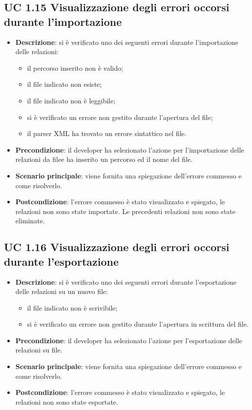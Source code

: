 	\subsection{UC 1.15 Visualizzazione degli errori occorsi durante l'importazione}
		\label{subsec:XEUC1.15}
		
		\begin{itemize}
			\item\textbf{Descrizione}: si è verificato uno dei seguenti errori durante l'importazione delle relazioni:
			\begin{itemize}
				\item il percorso inserito non è valido;
				\item il file indicato non esiste;
				\item il file indicato non è leggibile;
				\item si è verificato un errore non gestito durante l'apertura del file;
				\item il parser XML ha trovato un errore sintattico nel file.
			\end{itemize}
			\item\textbf{Precondizione}: il developer ha selezionato l'azione per l'importazione delle relazioni da filee ha inserito un percorso ed il nome del file.
			\item\textbf{Scenario principale}: viene fornita una spiegazione dell'errore commesso e come risolverlo.
			\item\textbf{Postcondizione}: l'errore commesso è stato visualizzato e spiegato, le relazioni non sono state importate. Le precedenti relazioni non sono state eliminate.
		\end{itemize}
		
	\subsection{UC 1.16 Visualizzazione degli errori occorsi durante l'esportazione}
		\label{subsec:XEUC1.16}
		
		\begin{itemize}
			\item\textbf{Descrizione}: si è verificato uno dei seguenti errori durante l'esportazione delle relazioni su un nuovo file:
			\begin{itemize}
				\item il file indicato non è scrivibile;
				\item si è verificato un errore non gestito durante l'apertura in scrittura del file.
			\end{itemize}
			\item\textbf{Precondizione}: il developer ha selezionato l'azione per l'esportazione delle relazioni su file.
			\item\textbf{Scenario principale}: viene fornita una spiegazione dell'errore commesso e come risolverlo.
			\item\textbf{Postcondizione}: l'errore commesso è stato visualizzato e spiegato, le relazioni non sono state esportate.
		\end{itemize}


